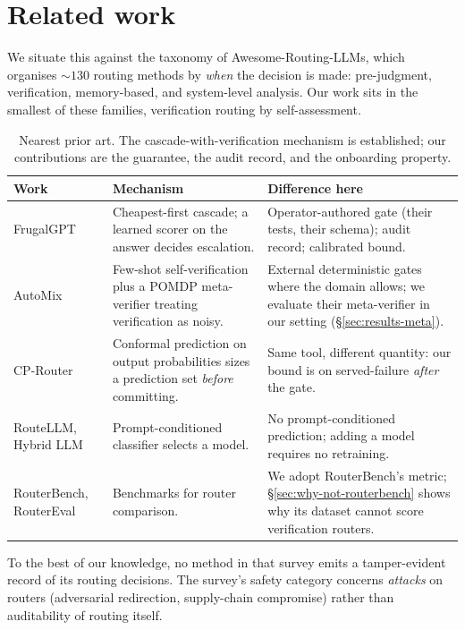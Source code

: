 \documentclass[11pt]{article}
\begin{document}
\section{Related work}
\label{sec:related}

We situate this against the taxonomy of Awesome-Routing-LLMs, which organises ${\sim}130$ routing
methods by \emph{when} the decision is made: pre-judgment, verification, memory-based, and
system-level analysis. Our work sits in the smallest of these families, verification routing by
self-assessment.

\begin{table}[h]
\centering
\small
\begin{tabular}{@{}p{}p{}p{}@{}}
\toprule
\textbf{Work} & \textbf{Mechanism} & \textbf{Difference here} \\
\midrule
FrugalGPT & Cheapest-first cascade; a learned scorer on the answer decides escalation. & Operator-authored gate (their tests, their schema); audit record; calibrated bound. \\
AutoMix & Few-shot self-verification plus a POMDP meta-verifier treating verification as noisy. & External deterministic gates where the domain allows; we evaluate their meta-verifier in our setting (\S\ref{sec:results-meta}). \\
CP-Router & Conformal prediction on output probabilities sizes a prediction set \emph{before} committing. & Same tool, different quantity: our bound is on served-failure \emph{after} the gate. \\
RouteLLM, Hybrid LLM & Prompt-conditioned classifier selects a model. & No prompt-conditioned prediction; adding a model requires no retraining. \\
RouterBench, RouterEval & Benchmarks for router comparison. & We adopt RouterBench's metric; \S\ref{sec:why-not-routerbench} shows why its dataset cannot score verification routers. \\
\bottomrule
\end{tabular}
\caption{Nearest prior art. The cascade-with-verification mechanism is established; our
contributions are the guarantee, the audit record, and the onboarding property.}
\end{table}

To the best of our knowledge, no method in that survey emits a tamper-evident record of its routing
decisions. The survey's safety category concerns \emph{attacks} on routers (adversarial redirection,
supply-chain compromise) rather than auditability of routing itself.
\end{document}
